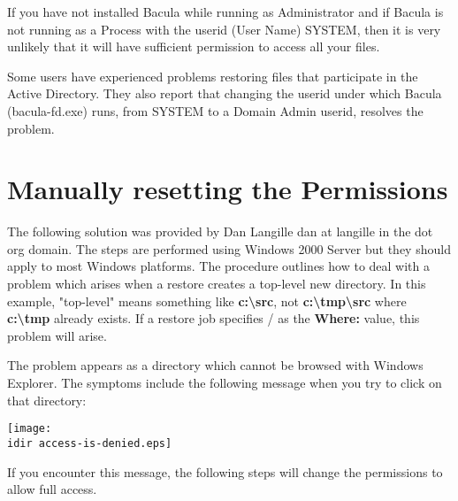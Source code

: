 If you have not installed Bacula while running as Administrator
and if Bacula is not running as a Process with the userid (User Name) SYSTEM, 
then it is very unlikely that it will have sufficient permission to
access all your files. 

Some users have experienced problems restoring files that participate in
the Active Directory. They also report that changing the userid under which
Bacula (bacula-fd.exe) runs, from SYSTEM to a Domain Admin userid, resolves
the problem.


\section{Manually resetting the Permissions}

The following solution was provided by Dan Langille \lt{}dan at langille in
the dot org domain\gt{}. The steps are performed using Windows 2000 Server but
they should apply to most Windows platforms. The procedure outlines how to deal
with a problem which arises when a restore creates a top-level new directory.
In this example, "top-level" means something like {\bf
c:\textbackslash{}src}, not {\bf c:\textbackslash{}tmp\textbackslash{}src}
where {\bf c:\textbackslash{}tmp} already exists. If a restore job specifies /
as the {\bf Where:} value, this problem will arise. 

The problem appears as a directory which cannot be browsed with Windows
Explorer. The symptoms include the following message when you try to click on
that directory: 

\texttt{[image: \\idir access-is-denied.eps]} 

If you encounter this message, the following steps will change the permissions
to allow full access. 

